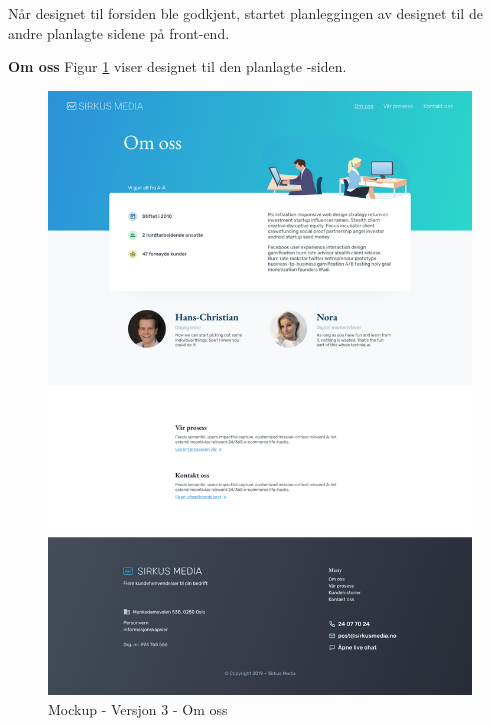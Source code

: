 Når designet til forsiden ble godkjent, startet planleggingen av designet til de andre planlagte sidene på front-end.

\textbf{Om oss}
Figur \ref{fig:mockup-v3-about} viser designet til den planlagte -siden.
\begin{figure}[H]
    \centering
    \includegraphics[height=.9\textheight]{mockup3-about.png}
    \caption{Mockup - Versjon 3 - Om oss}
    \label{fig:mockup-v3-about}
\end{figure}

